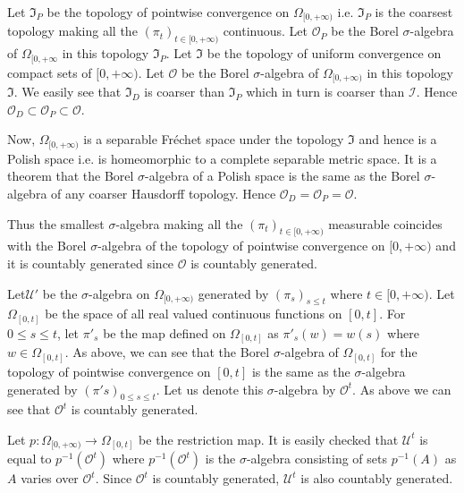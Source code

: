 Let $\mathfrak{I}_P$ be the topology of pointwise convergence on
$\Omega_{[0,+\infty)}$ i.e. $\mathfrak{I}_P$ is the coarsest topology
  making all the $(\pi_t)_{t\in [0,+\infty)}$ continuous. Let
    $\mathscr{O}_P$ be the Borel $\sigma$-algebra of
    $\Omega_{[0,+\infty}$ in this topology $\mathfrak{I}_P$. Let
      $\mathfrak{I}$ be the topology of uniform convergence on compact
      sets of $[0,+\infty)$. Let $\mathscr{O}$  be the Borel
        $\sigma$-algebra of $\Omega_{[0,+\infty)}$ in this topology
          $\mathfrak{I}$. We easily see that $\mathfrak{I}_D$ is
          coarser than $\mathfrak{I}_P$ which in turn is coarser than
          $\mathscr{I}$. Hence $\mathscr{O}_D \subset \mathscr{O}_P
          \subset \mathscr{O}$. 

Now, $\Omega_{[0,+\infty)}$ is a separable Fr\'echet space under the
  topology $\mathfrak{I}$ and hence is a Polish space i.e. is
  homeomorphic to a complete separable metric space. It is a theorem
  that the Borel $\sigma$-algebra of a Polish space is the same as the
  Borel $\sigma$-algebra of any coarser Hausdorff topology. Hence
  $\mathscr{O}_D = \mathscr{O}_P = \mathscr{O}$. 

Thus the smallest $\sigma$-algebra making all the
$(\pi_t)_{t\in[0,+\infty)}$ measurable coincides with the Borel
  $\sigma$-algebra of the topology of pointwise convergence on
  $[0,+\infty)$ and it is countably generated since $\mathscr{O}$ is
    countably generated. 

Let\pageoriginale $\mathcal{U}'$ be the $\sigma$-algebra on
$\Omega_{[0,+\infty)}$ generated by $(\pi_s)_{s\leq t}$ where $t \in
  [0,+\infty)$. Let $\Omega_{[0,t]}$ be the space of all real valued
    continuous functions on $[0,t]$. For $0 \leq s \leq t$, let
    $\pi'_s$ be the map defined on $\Omega_{[0,t]}$ as $\pi'_s(w) =
    w(s)$ where $w \in \Omega_{[0,t]}$. As above, we can see that the
    Borel $\sigma$-algebra of $\Omega_{[0,t]}$ for the topology of
    pointwise convergence on $[0,t]$ is the same as the
    $\sigma$-algebra generated by $(\pi's)_{0\leq s \leq t}$. Let us
    denote this $\sigma$-algebra by $\mathscr{O}^t$. As above we can
    see that $\mathscr{O}^t$ is countably generated.

Let $p:\Omega_{[0,+\infty)} \to \Omega_{[0,t]}$ be the restriction
  map. It is easily checked that $\mathcal{U}^t$ is equal to
  $p^{-1}(\mathscr{O}^t)$ where $p^{-1}(\mathscr{O}^t)$ is the
  $\sigma$-algebra consisting of sets $p^{-1}(A)$ as $A$ varies over
  $\mathscr{O}^t$. Since $\mathscr{O}^t$ is countably generated,
  $\mathcal{U}^t$ is also countably generated.

